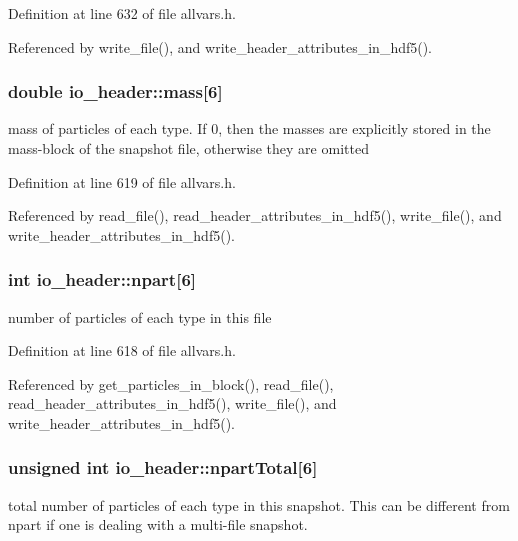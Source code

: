 Definition at line 632 of file allvars.h.



Referenced by write\_\-file(), and write\_\-header\_\-attributes\_\-in\_\-hdf5().

\hypertarget{structio__header_a2c387b0c7c823287d424fedc70175917}{
\subsubsection[{mass}]{\setlength{\rightskip}{0pt plus 5cm}double {\bf io\_\-header::mass}\mbox{[}6\mbox{]}}}
\label{structio__header_a2c387b0c7c823287d424fedc70175917}
mass of particles of each type. If 0, then the masses are explicitly stored in the mass-\/block of the snapshot file, otherwise they are omitted 

Definition at line 619 of file allvars.h.



Referenced by read\_\-file(), read\_\-header\_\-attributes\_\-in\_\-hdf5(), write\_\-file(), and write\_\-header\_\-attributes\_\-in\_\-hdf5().

\hypertarget{structio__header_adc88d581cf3d57eb975a51f587538bdd}{
\subsubsection[{npart}]{\setlength{\rightskip}{0pt plus 5cm}int {\bf io\_\-header::npart}\mbox{[}6\mbox{]}}}
\label{structio__header_adc88d581cf3d57eb975a51f587538bdd}
number of particles of each type in this file 

Definition at line 618 of file allvars.h.



Referenced by get\_\-particles\_\-in\_\-block(), read\_\-file(), read\_\-header\_\-attributes\_\-in\_\-hdf5(), write\_\-file(), and write\_\-header\_\-attributes\_\-in\_\-hdf5().

\hypertarget{structio__header_ad63a8b413a6b56c33bf5ecc25550a6dd}{
\subsubsection[{npartTotal}]{\setlength{\rightskip}{0pt plus 5cm}unsigned int {\bf io\_\-header::npartTotal}\mbox{[}6\mbox{]}}}
\label{structio__header_ad63a8b413a6b56c33bf5ecc25550a6dd}
total number of particles of each type in this snapshot. This can be different from npart if one is dealing with a multi-\/file snapshot. 

